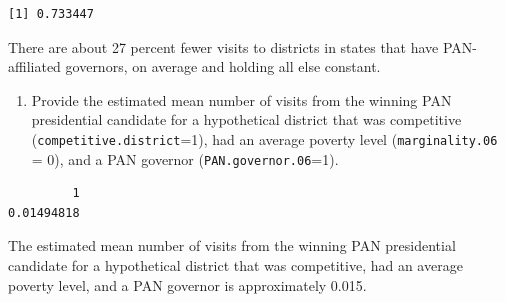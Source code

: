 \documentclass[12pt,letterpaper]{article}
\begin{document}


\begin{verbatim}
[1] 0.733447
\end{verbatim}

\noindent There are about 27 percent fewer visits to districts in states that have PAN-affiliated governors, on average and holding all else constant.

\begin{enumerate}
	\item [(c)] Provide the estimated mean number of visits from the winning PAN presidential candidate for a hypothetical district that was competitive (\texttt{competitive.district}=1), had an average poverty level (\texttt{marginality.06} = 0), and a PAN governor (\texttt{PAN.governor.06}=1).
\end{enumerate}



\begin{verbatim}
         1 
0.01494818 
\end{verbatim}

\noindent The estimated mean number of visits from the winning PAN presidential candidate for a hypothetical district that was competitive, had an average poverty level, and a PAN governor is approximately 0.015.
\end{document}
